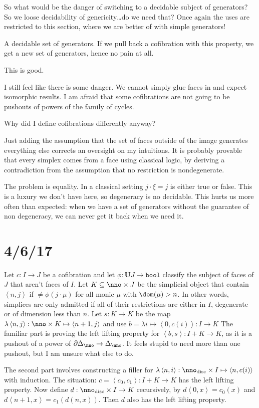 \documentclass{tac}
\newcommand\of{:}
\newcommand\simplex\Delta
\newcommand\cycle{\partial\Delta}
\newcommand\tuplet[1]{\left\langle #1 \right\rangle}
\newcommand\bool{\mathtt{bool}}
\newcommand\base{\mathbf{U}}
\newcommand\disc{_{\rm disc}}
\newcommand\function[2]{\lambda #1 \mapsto #2}
\begin{document}
So what would be the danger of switching to a decidable subject of generators?
So we loose decidability of genericity\dots do we need that?
Once again the uses are restricted to this section, where we are better of with simple generators!

A decidable set of generators. If we pull back a cofibration with this property, we get a new set of generators, hence no pain at all.

This is good.

I still feel like there is some danger. We cannot simply glue faces in and expect isomorphic results. I am afraid that some cofibrations are not going to be pushouts of powers of the family of cycles.

Why did I define cofibrations differently anyway?

Just adding the assumption that the set of faces outside of the image generates everything else corrects an oversight on my intuitions. It is probably provable that every simplex comes from a face using classical logic, by deriving a contradiction from the assumption that no restriction is nondegenerate.

The problem is equality. In a classical setting $j\cdot \xi = j$ is either true or false. This is a luxury we don't have here, so degeneracy is no decidable. This hurts us more often than expected: when we have a set of generators without the guarantee of non degeneracy, we can never get it back when we need it.

\section{4/6/17}
Let $c\of I\to J$ be a cofibration and let $\phi\of\base J\to\bool$ classify the subject of faces of $J$ that aren't faces of $I$.
Let $K\subseteq \nno\times J$ be the simplicial object that contain $\tuplet{n,j}$ if $\neq\phi(j\cdot\mu)$ for all monic $\mu$ with $\dom(\mu) > n$.
In other words, simplices are only admitted if all of their restrictions are either in $I$, degenerate or of dimension less than $n$.
Let $s\of K\to K$ be the map $\function{\tuplet{n,j}\of \nno\times K}\tuplet{n + 1,j}$ and use $b = \function i\tuplet{0,c(i)}\of I\to K$
The familiar part is proving the left lifting property for $\tuplet{b,s}\of I + K\to K$, as it is a pushout of a power of $\cycle_\nno \to \simplex_\nno$.
It feels stupid to need more than one pushout, but I am unsure what else to do.

The second part involves constructing a filler for $\function{\tuplet{n,i}\of \nno\disc\times I}\tuplet{n,c(i)}$ with induction.
The situation: $c=\tuplet{c_0,c_1}\of I + K\to K$ has the left lifting property. Now define $d\of\nno\disc\times I\to K$ recursively, by $d\tuplet{0,x} = c_0(x)$ and $d\tuplet{n + 1, x} = c_1(d(n,x))$. Then $d$ also has the left lifting property.
\end{document}
